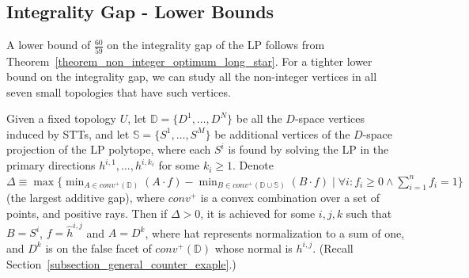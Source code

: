 \subsection{Integrality Gap - Lower Bounds}
\label{subsection_integrality_gap}
A lower bound of $\frac{60}{59}$ on the integrality gap of the LP follows from Theorem~\ref{theorem_non_integer_optimum_long_star}. For a tighter lower bound on the integrality gap, we can study all the non-integer vertices in all seven small topologies that have such vertices.

\begin{lemma}
\label{lemma_additive_gap}
Given a fixed topology $U$, let $\mathbb{D} = \{ D^1,\ldots,D^N \} $ be all the $D$-space vertices induced by STTs, and let $\mathbb{S} = \{S^1,\ldots,S^M \}$ be additional vertices of the $D$-space projection of the LP polytope, where each $S^i$ is found by solving the LP in the primary directions $h^{i,1},\ldots,h^{i,{k_i}}$ for some $k_i \ge 1$. Denote $\Delta \equiv \max \{ \min_{A \in conv^+(\mathbb{D})}(A \cdot f) - \min_{B \in conv^+(\mathbb{D} \cup \mathbb{S})} (B \cdot f) \mid \forall i: f_i \ge 0 \wedge \sum_{i=1}^{n}{f_i} = 1 \}$ (the largest additive gap), where $conv^+$ is a convex combination over a set of points, and positive rays.
Then if $\Delta > 0$, it is achieved for some $i,j,k$ such that $B=S^i$, $f = \hat{h}^{i,j}$ and $A = D^k$, where hat represents normalization to a sum of one, and $D^k$ is on the false facet of $conv^+(\mathbb{D})$ whose normal is $h^{i,j}$. (Recall Section~\ref{subsection_general_counter_exaple}.)
\end{lemma}

